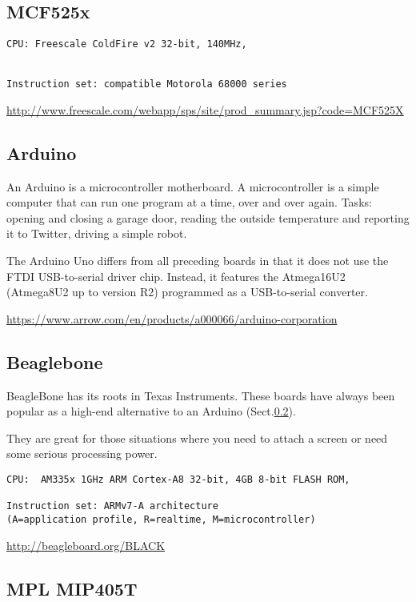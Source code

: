 \subsection{MCF525x}


\begin{verbatim}
CPU: Freescale ColdFire v2 32-bit, 140MHz, 


Instruction set: compatible Motorola 68000 series 
\end{verbatim}

\url{http://www.freescale.com/webapp/sps/site/prod_summary.jsp?code=MCF525X}

\subsection{Arduino}
\label{sec:Arduino}

An Arduino is a microcontroller motherboard. A microcontroller is a simple
computer that can run one program at a time, over and over again.
Tasks: opening and closing a garage door, reading the outside temperature and
reporting it to Twitter, driving a simple robot.

The  Arduino Uno differs from all preceding boards in that it does not use the
FTDI USB-to-serial driver chip. Instead, it features the Atmega16U2 (Atmega8U2
up to version R2) programmed as a USB-to-serial converter.

\url{https://www.arrow.com/en/products/a000066/arduino-corporation}




\subsection{Beaglebone}
\label{sec:BeagleBone}

BeagleBone has its roots in Texas Instruments.
These boards have always been popular as a high-end alternative to an Arduino (Sect.\ref{sec:Arduino}).

They are great for those situations where you need to attach a screen or need
some serious processing power.

\begin{verbatim}
CPU:  AM335x 1GHz ARM Cortex-A8 32-bit, 4GB 8-bit FLASH ROM,

Instruction set: ARMv7-A architecture 
(A=application profile, R=realtime, M=microcontroller)
\end{verbatim}
\url{http://beagleboard.org/BLACK}

\subsection{MPL MIP405T}
\label{sec:MPL_MIP405T}

